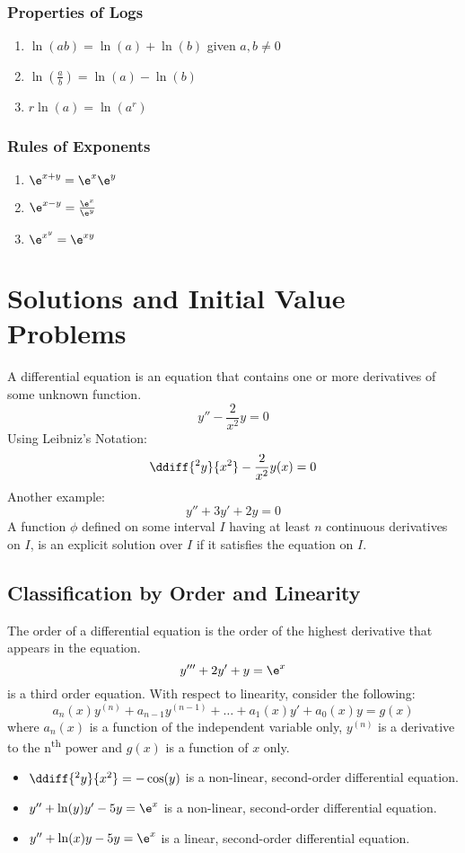 \documentclass{math}
\begin{document}
\subsubsection*{Properties of Logs}
\begin{enumerate}
  \item \( \ln(ab) = \ln(a)+\ln(b) \) given \( a,b\ne0 \)
  \item \( \ln(\frac{a}{b}) = \ln(a)-\ln(b) \)
  \item \( r\ln(a) = \ln(a^r) \)
\end{enumerate}

\subsubsection*{Rules of Exponents}
\begin{enumerate}
  \item \( \e^{x+y} = \e^x\e^y \)
  \item \( \e^{x-y} = \frac{\e^x}{\e^y} \)
  \item \( \e^{x^y} = \e^{xy} \)
\end{enumerate}

\section*{Solutions and Initial Value Problems}
A differential equation is an equation that contains one or more derivatives of
some unknown function.
\[ y''-\frac{2}{x^2}y = 0 \]
Using Leibniz's Notation:
\[ \ddiff{^2y}{x^2}-\frac{2}{x^2}y(x) = 0 \]
Another example:
\[ y''+3y'+2y = 0 \]
A function \( \phi \) defined on some interval \( I \) having at least \( n \)
continuous derivatives on \( I \), is an explicit solution over \( I \) if it
satisfies the equation on \( I \).

\subsection*{Classification by Order and Linearity}
The order of a differential equation is the order of the highest derivative that
appears in the equation.
\[ y'''+2y'+y = \e^x \]
is a third order equation. With respect to linearity, consider the following:
\[ a_n(x)y^{(n)}+a_{n-1}y^{(n-1)}+\dots+a_1(x)y'+a_0(x)y = g(x) \]
where \( a_n(x) \) is a function of the independent variable only,
\( y^{(n)} \) is a derivative to the n\textsuperscript{th} power and \( g(x) \)
is a function of \( x \) only.
\begin{itemize}
  \item \( \ddiff{^2y}{x^2} = -\cos(y) \) is a non-linear, second-order
  differential equation.
  \item \( y''+\ln(y)y'-5y = \e^x \) is a non-linear, second-order differential
  equation.
  \item \( y''+\ln(x)y-5y = \e^x \) is a linear, second-order differential
  equation.
\end{itemize}
\end{document}
